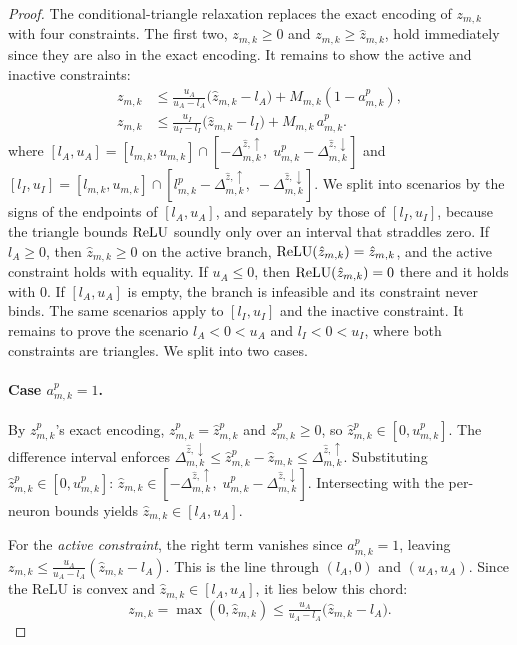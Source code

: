 {{\begin{proof}
The conditional-triangle relaxation replaces the exact encoding of $z_{m,k}$ with four
constraints. The first two, $z_{m,k}\geq 0$ and $z_{m,k}\geq \hat z_{m,k}$, hold
immediately since they are also in the exact encoding. It remains to show the active and
inactive constraints:
\begin{align*}
 z_{m,k} &\le \tfrac{u_A}{u_A - l_A}\bigl(\hat z_{m,k} - l_A\bigr) + M_{m,k}(1 - a^{p}_{m,k}), \\
 z_{m,k} &\le \tfrac{u_I}{u_I - l_I}\bigl(\hat z_{m,k} - l_I\bigr) + M_{m,k}\,a^{p}_{m,k}.
\end{align*}
where
$[l_A, u_A] = [l_{m,k}, u_{m,k}] \cap [-\Delta^{\hat z,\uparrow}_{m,k},\; u^{p}_{m,k} - \Delta^{\hat z,\downarrow}_{m,k}]$
and
$[l_I, u_I] = [l_{m,k}, u_{m,k}] \cap [l^{p}_{m,k} - \Delta^{\hat z,\uparrow}_{m,k},\; -\Delta^{\hat z,\downarrow}_{m,k}]$.
We split into scenarios by the signs of the endpoints of $[l_A,u_A]$, and separately by
those of $[l_I,u_I]$, because the triangle bounds $\mathrm{ReLU}$ soundly only over an interval
that straddles zero. If $l_A\geq 0$, then $\hat z_{m,k}\geq 0$ on the active branch,
$\mathrm{ReLU}(\hat z_{m,k})=\hat z_{m,k}$, and the active constraint holds with equality. If
$u_A\leq 0$, then $\mathrm{ReLU}(\hat z_{m,k})=0$ there and it holds with $0$. If $[l_A,u_A]$ is
empty, the branch is infeasible and its constraint never binds. The same scenarios apply
to $[l_I,u_I]$ and the inactive constraint. It remains to prove the scenario
$l_A < 0 < u_A$ and $l_I < 0 < u_I$, where both constraints are triangles. We split into
two cases.

\paragraph{Case $a^{p}_{m,k}=1$.}
By $z^{p}_{m,k}$'s exact encoding, $z^{p}_{m,k}=\hat z^{p}_{m,k}$ and
$z^{p}_{m,k}\geq 0$, so $\hat z^{p}_{m,k}\in[0,u^{p}_{m,k}]$. The difference
interval enforces
$\Delta^{\hat z,\downarrow}_{m,k}\leq \hat z^{p}_{m,k}-\hat z_{m,k}\leq \Delta^{\hat z,\uparrow}_{m,k}$.
Substituting $\hat z^{p}_{m,k}\in[0,u^{p}_{m,k}]$:
$\hat z_{m,k}\in[-\Delta^{\hat z,\uparrow}_{m,k},\; u^{p}_{m,k}-\Delta^{\hat z,\downarrow}_{m,k}]$.
Intersecting with the per-neuron bounds yields
$\hat z_{m,k}\in[l_A,u_A]$.

For the \emph{active constraint}, the right term vanishes since $a^{p}_{m,k}=1$, leaving
$z_{m,k}\leq \tfrac{u_A}{u_A-l_A}(\hat z_{m,k}-l_A)$. This is the line through
$(l_A,0)$ and $(u_A,u_A)$. Since the ReLU is convex and
$\hat z_{m,k}\in[l_A,u_A]$, it lies below this chord:
\[
 z_{m,k}=\max(0,\hat z_{m,k})\leq \tfrac{u_A}{u_A-l_A}\bigl(\hat z_{m,k}-l_A\bigr).
\]



\end{proof}}}
